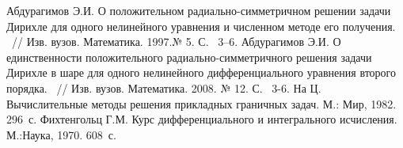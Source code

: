 \begin{thebibliography}{111}
 Абдурагимов Э.И. О положительном радиально-симметричном решении
 задачи Дирихле для одного нелинейного  уравнения и численном методе
 его получения. ~// Изв. вузов. Математика. 1997.№ 5. С. ~3--6.
Абдурагимов Э.И. О единственности положительного
радиально-симметричного решения задачи Дирихле в шаре для одного
нелинейного дифференциального уравнения второго порядка. ~// Изв.
вузов. Математика. 2008. № 12. С. ~3-6.
 На Ц. Вычислительные методы решения прикладных граничных задач.
 М.: Мир, 1982. 296~с.
Фихтенгольц Г.М. Курс дифференциального и интегрального исчисления.
М.:Наука, 1970. 608~с.











\end{thebibliography}
